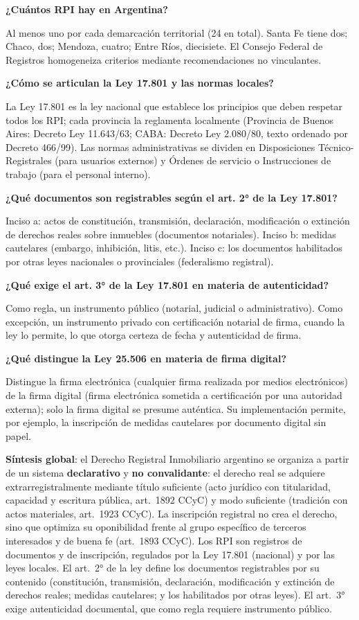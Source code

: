 \documentclass[12pt,oneside]{book}
\begin{document}
\textbf{¿Cuántos RPI hay en Argentina?}

Al menos uno por cada demarcación territorial (24 en total). Santa Fe tiene dos; Chaco, dos; Mendoza, cuatro; Entre Ríos, diecisiete. El Consejo Federal de Registros homogeneiza criterios mediante recomendaciones no vinculantes.

\textbf{¿Cómo se articulan la Ley 17.801 y las normas locales?}

La Ley 17.801 es la ley nacional que establece los principios que deben respetar todos los RPI; cada provincia la reglamenta localmente (Provincia de Buenos Aires: Decreto Ley 11.643/63; CABA: Decreto Ley 2.080/80, texto ordenado por Decreto 466/99). Las normas administrativas se dividen en Disposiciones Técnico-Registrales (para usuarios externos) y Órdenes de servicio o Instrucciones de trabajo (para el personal interno).

\textbf{¿Qué documentos son registrables según el art. 2° de la Ley 17.801?}

Inciso a: actos de constitución, transmisión, declaración, modificación o extinción de derechos reales sobre inmuebles (documentos notariales). Inciso b: medidas cautelares (embargo, inhibición, litis, etc.). Inciso c: los documentos habilitados por otras leyes nacionales o provinciales (federalismo registral).

\textbf{¿Qué exige el art. 3° de la Ley 17.801 en materia de autenticidad?}

Como regla, un instrumento público (notarial, judicial o administrativo). Como excepción, un instrumento privado con certificación notarial de firma, cuando la ley lo permite, lo que otorga certeza de fecha y autenticidad de firma.

\textbf{¿Qué distingue la Ley 25.506 en materia de firma digital?}

Distingue la firma electrónica (cualquier firma realizada por medios electrónicos) de la firma digital (firma electrónica sometida a certificación por una autoridad externa); solo la firma digital se presume auténtica. Su implementación permite, por ejemplo, la inscripción de medidas cautelares por documento digital sin papel.

\begin{important}
\textbf{Síntesis global}: el Derecho Registral Inmobiliario argentino se organiza a partir de un sistema \textbf{declarativo} y \textbf{no convalidante}: el derecho real se adquiere extrarregistralmente mediante título suficiente (acto jurídico con titularidad, capacidad y escritura pública, art.\ 1892 CCyC) y modo suficiente (tradición con actos materiales, art.\ 1923 CCyC). La inscripción registral no crea el derecho, sino que optimiza su oponibilidad frente al grupo específico de terceros interesados y de buena fe (art.\ 1893 CCyC). Los RPI son registros de documentos y de inscripción, regulados por la Ley 17.801 (nacional) y por las leyes locales. El art.\ 2° de la ley define los documentos registrables por su contenido (constitución, transmisión, declaración, modificación y extinción de derechos reales; medidas cautelares; y los habilitados por otras leyes). El art.\ 3° exige autenticidad documental, que como regla requiere instrumento público.
\end{important}
\end{document}

